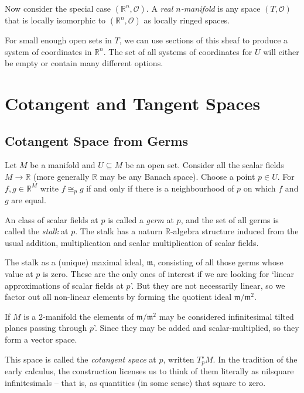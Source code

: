 \documentclass[oneside,english]{amsbook}
\numberwithin{section}{chapter}
\theoremstyle{plain}
\theoremstyle{definition}
\begin{document}
Now consider the special case $(\mathbb{R}^n, \mathscr{O})$. A \emph{real $n$-manifold} is any space  $(T, \mathscr{O})$ that is locally isomorphic to $(\mathbb{R}^n, \mathscr{O})$ as locally ringed spaces.

For small enough open sets in $T$, we can use sections of this sheaf to produce a system of coordinates in $\mathbb{R}^n$. The set of all systems of coordinates for $U$ will either be empty or contain many different options.

\section{Cotangent and Tangent Spaces}

\subsection{Cotangent Space from Germs}

Let $M$ be a manifold and $U\subseteq M$ be an open set. Consider all the scalar fields $M\to \mathbb{R}$ (more generally $\mathbb{R}$ may be any Banach space). Choose a point $p\in U$. For $f, g\in \mathbb{R}^M$ write $f\cong_p g$ if and only if there is a neighbourhood of $p$ on which $f$ and $g$ are equal.

An class of scalar fields at $p$ is called a \emph{germ} at $p$, and the set of all germs is called the \emph{stalk} at $p$. The stalk has a naturn $\mathbb{R}$-algebra structure induced from the usual addition, multiplication and scalar multiplication of scalar fields.

The stalk as a (unique) maximal ideal, $\mathfrak{m}$, consisting of all those germs whose value at $p$ is zero. These are the only ones of interest if we are looking for `linear approximations of scalar fields at $p$'. But they are not necessarily linear, so we factor out all non-linear elements by forming the quotient ideal $\mathfrak{m}/\mathfrak{m}^2$. 

If $M$ is a 2-manifold the elements of $\mathfrak{m}/\mathfrak{m}^2$ may be considered infinitesimal tilted planes passing through $p$'. Since they may be added and scalar-multiplied, so they form a vector space.

This space is called the \emph{cotangent space} at $p$, written $T^\star_p M$. In the tradition of the early calculus, the construction licenses us to think of them literally as nilsquare infinitesimals -- that is, as quantities (in some sense) that square to zero.
\end{document}
